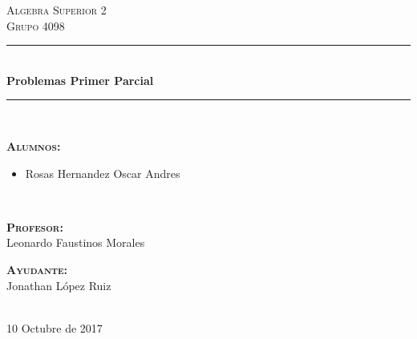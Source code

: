 \documentclass[12pt, fleqn]{article}                             %
\author{Oscar Andrés Rosas}                                     %
\begin{document}
\begin{titlepage}

    \center
    \textsc{\Large Algebra Superior 2}\\[0.5cm] 
    \textsc{\large Grupo 4098}\\[1.0cm]

    \rule{\linewidth}{0.5mm} \\[1.0cm]
        { \huge \bfseries Problemas Primer Parcial}\\[1.0cm] 
    \rule{\linewidth}{0.5mm} \\[1.5cm]
     
    \begin{minipage}{0.55\textwidth}
        \begin{flushleft}
            \footnotesize{
            \textbf{\textsc{Alumnos:}}\\
                \begin{itemize}
                    \item Rosas Hernandez Oscar Andres
                \end{itemize}
            }
        \end{flushleft}
    \end{minipage}
    ~
    \begin{minipage}{0.4\textwidth}
        \begin{flushright} \footnotesize
            \textbf{\textsc{Profesor: }}\\
            Leonardo Faustinos Morales

            \vspace{2em}

            \textbf{\textsc{Ayudante: }}\\
            Jonathan López Ruiz
        \end{flushright}
    \end{minipage}\\[3,5cm]

    
    {\large 10 Octubre de 2017}\\[1cm] 

    \vfill

\end{titlepage}






\end{document}
